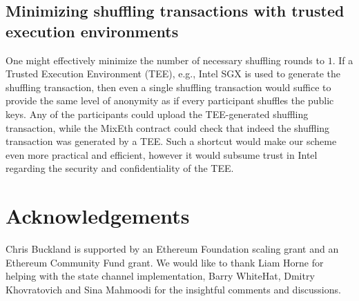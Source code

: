 \documentclass[a4paper]{article}
\theoremstyle{definition}
\begin{document}
\subsection{Minimizing shuffling transactions with trusted execution environments}
One might effectively minimize the number of necessary shuffling rounds to $1$. If a Trusted Execution Environment (TEE), e.g., Intel SGX is used to generate the shuffling transaction, then even a single shuffling transaction would suffice to provide the same level of anonymity as if every participant shuffles the public keys. Any of the participants could upload the TEE-generated shuffling transaction, while the MixEth contract could check that indeed the shuffling transaction was generated by a TEE. Such a shortcut would make our scheme even more practical and efficient, however it would subsume trust in Intel regarding the security and confidentiality of the TEE.      
 
 
\section{Acknowledgements}
Chris Buckland is supported by an Ethereum Foundation
scaling grant and an Ethereum Community Fund grant.
We would like to thank Liam Horne for helping with the state channel implementation, Barry WhiteHat, Dmitry Khovratovich and Sina Mahmoodi for the insightful comments and discussions. 



\end{document}
